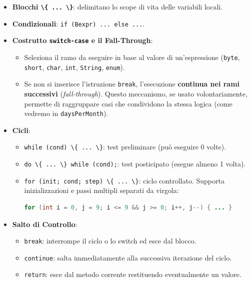 \documentclass[11pt,a4paper,oneside]{report}
\newcommand{\passthrough}[1]{#1}
\providecommand{\tightlist}{\setlength{\itemsep}{0pt}\setlength{\parskip}{0pt}}
\begin{document}
\begin{itemize}
\tightlist
\item
  \textbf{Blocchi \passthrough{\lstinline!\{ ... \}!}}: delimitano lo
  scope di vita delle variabili locali.
\item
  \textbf{Condizionali}:
  \passthrough{\lstinline!if (Bexpr) ... else ...!}.
\item
  \textbf{Costrutto \passthrough{\lstinline!switch-case!} e il
  Fall-Through}:

  \begin{itemize}
  \tightlist
  \item
    Seleziona il ramo da eseguire in base al valore di un'espressione
    (\passthrough{\lstinline!byte!}, \passthrough{\lstinline!short!},
    \passthrough{\lstinline!char!}, \passthrough{\lstinline!int!},
    \passthrough{\lstinline!String!}, \passthrough{\lstinline!enum!}).
  \item
    Se non si inserisce l'istruzione \passthrough{\lstinline!break!},
    l'esecuzione \textbf{continua nei rami successivi}
    (\emph{fall-through}). Questo meccanismo, se usato volontariamente,
    permette di raggruppare casi che condividono la stessa logica (come
    vedremo in \passthrough{\lstinline!daysPerMonth!}).
  \end{itemize}
\item
  \textbf{Cicli}:

  \begin{itemize}
  \item
    \passthrough{\lstinline!while (cond) \{ ... \}!}: test preliminare
    (può eseguire 0 volte).
  \item
    \passthrough{\lstinline!do \{ ... \} while (cond);!}: test
    posticipato (esegue almeno 1 volta).
  \item
    \passthrough{\lstinline!for (init; cond; step) \{ ... \}!}: ciclo
    controllato. Supporta inizializzazioni e passi multipli separati da
    virgola:

\begin{lstlisting}[language=Java]
for (int i = 0, j = 9; i <= 9 && j >= 0; i++, j--) { ... }
\end{lstlisting}
  \end{itemize}
\item
  \textbf{Salto di Controllo}:

  \begin{itemize}
  \tightlist
  \item
    \passthrough{\lstinline!break!}: interrompe il ciclo o lo switch ed
    esce dal blocco.
  \item
    \passthrough{\lstinline!continue!}: salta immediatamente alla
    successiva iterazione del ciclo.
  \item
    \passthrough{\lstinline!return!}: esce dal metodo corrente
    restituendo eventualmente un valore.
  \end{itemize}
\end{itemize}
\end{document}
